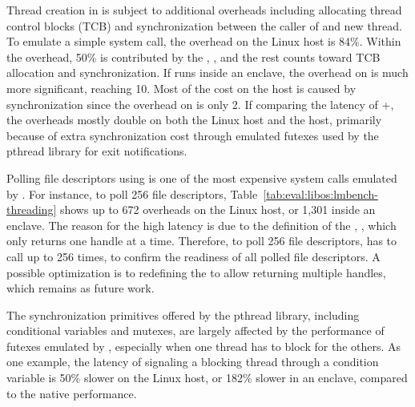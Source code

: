 \label{sec:eval:libos:threading}


\begin{table}[t!b!]

\caption{Performance of threading and scheduling operations, including cloning a thread, polling file descriptors, and synchronization primitives (signaling a conditional variable, acquiring a mutex). The comparison is among (1) native Linux processes; (2) \graphene{} on Linux host, both without and with \seccomp{} filter ({\bf +SC}) and reference monitor ({\bf +RM}); (3) \graphenesgx{}.
System call latency is in microseconds, and lower is better.
Overheads are relative to Linux; negative overheads indicate improvement.} 
\label{tab:eval:libos:lmbench-threading}
\end{table}


Thread creation in \thelibos{}
is subject to additional overheads including allocating thread control blocks (TCB)
and synchronization between the caller of  and new thread.
To emulate a simple  system call, the overhead on the Linux host is \roughly{}84\%.
Within the overhead, 50\% is contributed
by the \hostapi{}, , and the rest counts toward
TCB allocation and synchronization.
If \thelibos{} runs inside an enclave,
the overhead on  is much more significant, reaching \roughly{}10\x{}.
Most of the cost on the \sgx{} host
is caused by synchronization since the overhead on  is only 2\x{}.
If comparing the latency of +, the overheads mostly double on both the Linux host and the \sgx{} host,
primarily because of extra synchronization cost
through emulated futexes
used by the pthread library for exit notifications.



Polling file descriptors using  is one of the most expensive system calls
emulated by \thelibos{}.
For instance, to poll 256 file descriptors,
Table~\ref{tab:eval:libos:lmbench-threading} shows up to 672\x{} overheads on the Linux host, or 1,301\x{} inside an enclave.
The reason for the high latency
is due to the definition of the \hostapi{}, ,
which only returns one handle at a time.
Therefore, to poll 256 file descriptors,
\thelibos{} has to call  up to 256 times, to confirm
the readiness of all polled file descriptors.
A possible optimization
is to redefining the \hostapi{} to allow returning multiple handles,
which remains as future work.


The synchronization primitives offered by the pthread library,
including conditional variables and mutexes, 
are largely affected by the performance of futexes emulated by \thelibos{},
especially when one thread has to block for the others.
As one example,
the latency of signaling a blocking thread
through a condition variable
is 50\% slower on the Linux host, or 182\% slower in an enclave,
compared to the native performance.





